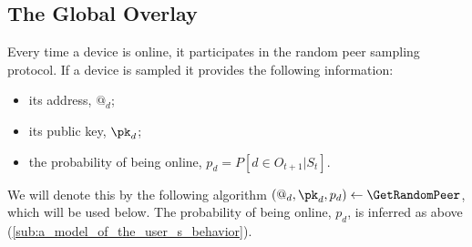 \subsection{The Global Overlay}
\label{sec:global_overlay}




Every time a device is online, it participates in the random peer sampling 
protocol.
If a device is sampled it provides the following information:
\begin{itemize}
  \item its address, $@_d$;
  \item its public key, \(\pk_d\);
  \item the probability of being online, $p_d=P\left[d \in O_{t+1} | S_t\right] $.
\end{itemize}
We will denote this by the following algorithm $(@_d, \pk_d, p_d)\gets 
  \GetRandomPeer$, which will be used below.
The probability of being online, \(p_d\), is inferred as above 
(\ref{sub:a_model_of_the_user_s_behavior}).

